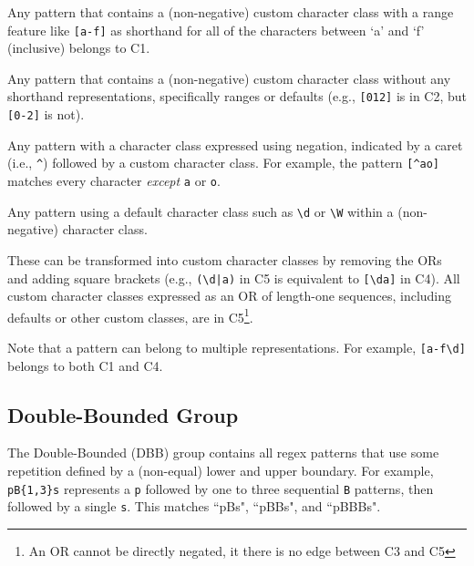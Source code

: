 \begin{description} \itemsep -1pt
\item[C1:] Any pattern that contains a (non-negative) custom character class with a range feature like \verb![a-f]! as shorthand for all of the characters between `a' and `f' (inclusive) belongs to C1.


\item[C2:] Any pattern that contains a (non-negative) custom character class without any shorthand representations, specifically ranges or defaults (e.g., \verb![012]! is in C2, but \verb![0-2]! is not).


\item[C3:] Any pattern with a character class expressed using negation, indicated by a caret (i.e., \verb!^!) followed by a custom character class.
For example, the pattern \verb![^ao]! matches every character \emph{except} \verb!a! or \verb!o!.


\item[C4:] Any pattern using a default character class such as \verb!\d! or \verb!\W! within a (non-negative) character class. %

\item[C5:] These can be transformed into custom character classes by removing the ORs and adding square brackets (e.g., \verb!(\d|a)! in C5 is equivalent to \verb![\da]! in C4). All custom character classes expressed as an OR of length-one sequences, including defaults or other custom classes, are in C5\footnote{An OR cannot be directly negated, it there is no edge between C3 and C5}.
\end{description}

Note that a pattern can belong to multiple representations. For example, \verb![a-f\d]! belongs to both C1 and C4.

\subsection{Double-Bounded Group}
The Double-Bounded (DBB) group contains all regex patterns that use some repetition defined by a (non-equal) lower and upper boundary. For example, \verb!pB{1,3}s! represents a \verb!p! followed by one to three sequential \verb!B! patterns, then followed by a single \verb!s!. This matches ``pBs", ``pBBs", and ``pBBBs".

